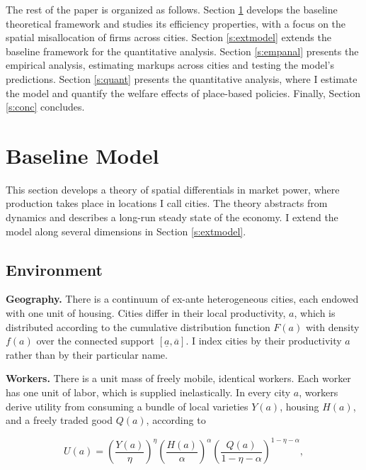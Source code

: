 The rest of the paper is organized as follows. Section \ref{s:model} develops the baseline theoretical framework and studies its efficiency properties, with a focus on the spatial misallocation of firms across cities. Section \ref{s:extmodel} extends the baseline framework for the quantitative analysis. Section \ref{s:empanal} presents the empirical analysis, estimating markups across cities and testing the model’s predictions. Section \ref{s:quant} presents the quantitative analysis, where I estimate the model and quantify the welfare effects of place-based policies. Finally, Section \ref{s:conc} concludes.

\newpage

\section{Baseline Model}\label{s:model}

This section develops a theory of spatial differentials in market power, where production takes place in locations I call cities. The theory abstracts from dynamics and describes a long-run steady state of the economy. I extend the model along several dimensions in Section \ref{s:extmodel}.  

\subsection{Environment}

\textbf{Geography.} There is a continuum of ex-ante heterogeneous cities, each endowed with one unit of housing. Cities differ in their local productivity, $a$, which is distributed according to the cumulative distribution function $F(a)$ with density $f(a)$ over the connected support $[\underline{a}, \overline{a}]$. I index cities by their productivity $a$ rather than by their particular name.  

\textbf{Workers.} There is a unit mass of freely mobile, identical workers. Each worker has one unit of labor, which is supplied inelastically. In every city $a$, workers derive utility from consuming a bundle of local varieties $Y(a)$, housing $H(a)$, and a freely traded good $Q(a)$, according to  

\begin{equation}\label{eq:pref}
	U(a) = \left(\frac{Y(a)}{\eta}\right)^{\eta} \left(\frac{H(a)}{\alpha}\right)^{\alpha}  \left(\frac{Q(a)}{1 - \eta - \alpha}\right)^{1 - \eta - \alpha}, 
\end{equation}  

